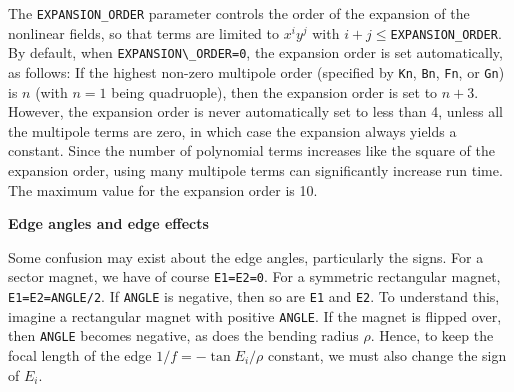 The \verb|EXPANSION_ORDER| parameter controls the order of the expansion of the nonlinear
fields, so that terms are limited to $x^i y^j$ with $i+j\leq$\verb|EXPANSION_ORDER|.
By default, when \verb|EXPANSION\_ORDER=0|, the expansion order is set automatically, as follows:
If the highest non-zero multipole order (specified by \verb|Kn|, \verb|Bn|, \verb|Fn|, or \verb|Gn|)
is $n$ (with $n=1$ being quadruople), then the expansion order is set to $n+3$.
However, the expansion order is never automatically set to less than 4, unless all the 
multipole terms are zero, in which case the expansion always yields a constant.
Since the number of polynomial terms increases like the square of the expansion order, using many
multipole terms can significantly increase run time.
The maximum value for the expansion order is 10.

{\bf Edge angles and edge effects} 

Some confusion may exist about the edge angles, particularly the signs.
For a sector magnet, we have of course \verb|E1=E2=0|.  For a symmetric rectangular
magnet, \verb|E1=E2=ANGLE/2|.  If \verb|ANGLE| is negative, then so are
\verb|E1| and \verb|E2|.  To understand this, imagine a rectangular magnet with positive \verb|ANGLE|.
If the magnet is flipped over, then \verb|ANGLE| becomes negative, as does the bending
radius $\rho$.    Hence, to keep the focal length
of the edge $1/f = -\tan E_i /\rho$ constant, we must also change the sign of
$E_i$.

